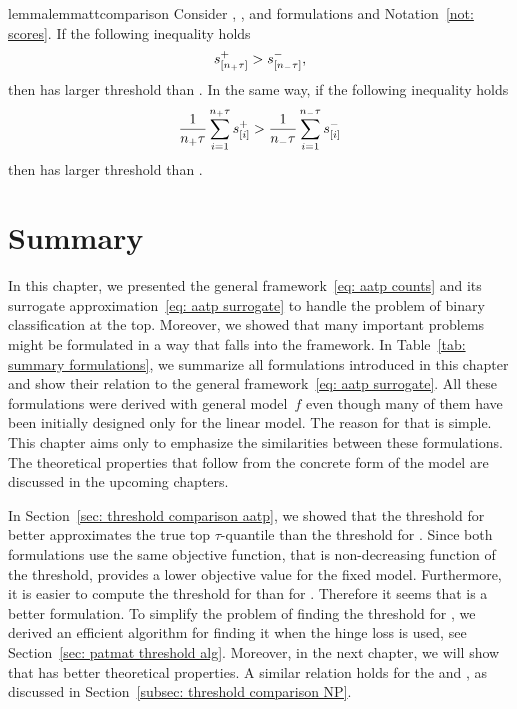 \begin{restatable}{lemma}{lemmattcomparison}\label{lemma: threshold comparison 2}
  Consider \Grill, \GrillNP, \TopMeanK and \tauFPL formulations and Notation~\ref{not: scores}. If the following inequality holds
  \begin{equation*}
    s_{[n_{+}\tau]}^+ > s_{[n_{-}\tau]}^-,
  \end{equation*}
  then \Grill has larger threshold than \GrillNP. In the same way, if the following inequality holds
  \begin{equation*}
    \frac{1}{n_{+}\tau}\sum_{i=1}^{n_{+}\tau} s_{[i]}^+
      > \frac{1}{n_{-}\tau}\sum_{i=1}^{n_{-}\tau} s_{[i]}^-
  \end{equation*}
  then \TopMeanK has larger threshold than \tauFPL.
\end{restatable}

\section{Summary}

In this chapter, we presented the general framework~\eqref{eq: aatp counts} and its surrogate approximation~\eqref{eq: aatp surrogate} to handle the problem of binary classification at the top. Moreover, we showed that many important problems might be formulated in a way that falls into the framework. In Table~\ref{tab: summary formulations}, we summarize all formulations introduced in this chapter and show their relation to the general framework~\eqref{eq: aatp surrogate}. All these formulations were derived with general model~$f$ even though many of them have been initially designed only for the linear model. The reason for that is simple. This chapter aims only to emphasize the similarities between these formulations. The theoretical properties that follow from the concrete form of the model are discussed in the upcoming chapters.

In Section~\ref{sec: threshold comparison aatp}, we showed that the threshold for \TopMeanK better approximates the true top $\tau$-quantile than the threshold for \PatMat. Since both formulations use the same objective function, that is non-decreasing function of the threshold, \TopMeanK provides a lower objective value for the fixed model. Furthermore, it is easier to compute the threshold for \TopMeanK than for \PatMat. Therefore it seems that \TopMeanK is a better formulation. To simplify the problem of finding the threshold for \PatMat, we derived an efficient algorithm for finding it when the hinge loss is used, see Section~\ref{sec: patmat threshold alg}. Moreover, in the next chapter, we will show that \PatMat has better theoretical properties. A similar relation holds for the \tauFPL and \PatMatNP, as discussed in Section~\ref{subsec: threshold comparison NP}.

